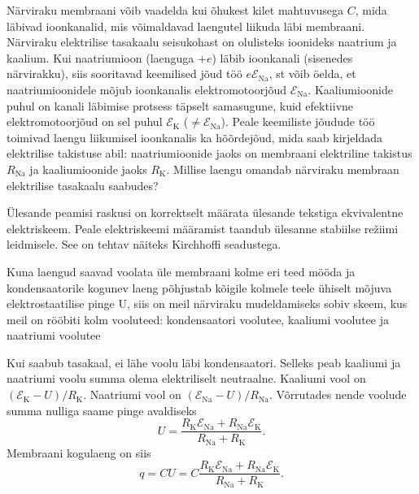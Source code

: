 
Närviraku membraani võib vaadelda kui õhukest kilet mahtuvusega $C$, mida läbivad ioonkanalid, mis võimaldavad laengutel liikuda läbi
membraani. Närviraku elektrilise tasakaalu seisukohast on olulisteks ioonideks
naatrium ja kaalium. Kui naatriumioon (laenguga $+e$) läbib ioonkanali (sisenedes närvirakku), siis sooritavad keemilised jõud töö $e\mathcal{E}_{\mathrm{Na}}$, st võib öelda, et
naatriumioonidele mõjub ioonkanalis elektromotoorjõud $\mathcal{E}_{\mathrm{Na}}$. Kaaliumioonide
puhul on kanali läbimise protsess täpselt samasugune, kuid efektiivne elektromotoorjõud on sel puhul $\mathcal{E}_{\mathrm{K}}$ ($\neq \mathcal{E}_{\mathrm{Na}}$). Peale keemiliste jõudude töö toimivad
laengu liikumisel ioonkanalis ka hõõrdejõud, mida saab kirjeldada elektrilise
takistuse abil: naatriumioonide jaoks on membraani elektriline takistus $R_{\mathrm{Na}}$ ja kaaliumioonide jaoks $R_{\mathrm{K}}$. Millise laengu omandab närviraku membraan
elektrilise tasakaalu saabudes? 

\hint
Ülesande peamisi raskusi on korrektselt määrata ülesande tekstiga ekvivalentne elektriskeem. Peale elektriskeemi määramist taandub ülesanne stabiilse režiimi leidmisele. See on tehtav näiteks Kirchhoffi seadustega.

\solu
Kuna laengud saavad voolata üle membraani kolme eri teed mööda ja kondensaatorile kogunev laeng põhjustab kõigile kolmele teele ühiselt mõjuva elektrostaatilise
pinge U, siis on meil närviraku mudeldamiseks sobiv skeem, kus meil on rööbiti kolm
vooluteed: kondensaatori voolutee, kaaliumi voolutee ja naatriumi voolutee


Kui saabub tasakaal, ei lähe voolu läbi kondensaatori. Selleks peab kaaliumi ja naatriumi voolu summa olema elektriliselt neutraalne. Kaaliumi vool on $(\mathcal{E}_{\mathrm{K}} - U)/R_\mathrm{K}$.
Naatriumi vool on $(\mathcal{E}_{\mathrm{Na}} - U)/R_{\mathrm{Na}}$. Võrrutades nende voolude summa nulliga saame
pinge avaldiseks
\[
U=\frac{R_{\mathrm{K}} \mathcal{E}_{\mathrm{Na}}+R_{\mathrm{Na}} \mathcal{E}_{\mathrm{K}}}{R_{\mathrm{Na}}+R_{\mathrm{K}}}.
\]
Membraani kogulaeng on siis
\[
q=C U=C \frac{R_{\mathrm{K}} \mathcal{E}_{\mathrm{Na}}+R_{\mathrm{Na}} \mathcal{E}_{\mathrm{K}}}{R_{\mathrm{Na}}+R_{\mathrm{K}}}.
\]
\probend